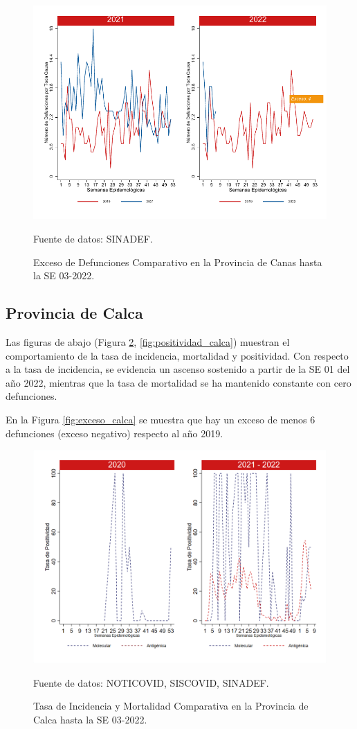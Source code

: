 \documentclass[12pt,a4paper,openany]{book}
\begin{document}
		\begin{figure}[h]
			\caption{Exceso de Defunciones Comparativo en la Provincia de Canas hasta la SE 03-2022.}\label{fig:exceso_canas}
			\begin{center}
				\includegraphics[width=0.7\linewidth]{../figuras/exceso_3.pdf}
			\end{center}
			{\footnotesize {Fuente de datos: SINADEF.}}
		\end{figure}
		
		\clearpage
		
		\subsection*{Provincia de Calca}
		\noindent Las figuras de abajo (Figura \ref{fig:inc_mort_calca}, \ref{fig:positividad_calca}) muestran el comportamiento de la tasa de incidencia, mortalidad y  positividad. Con respecto a la tasa de incidencia, se evidencia un ascenso sostenido a partir de la SE 01 del año 2022, mientras que la tasa de mortalidad se ha mantenido constante con cero defunciones. 
		
		En la Figura \ref{fig:exceso_calca} se muestra que hay un exceso de menos 6 defunciones (exceso negativo) respecto al año 2019.
		
		\begin{figure}[h]
			\caption{Tasa de Incidencia y Mortalidad Comparativa en la Provincia de Calca hasta la SE 03-2022.}\label{fig:inc_mort_calca}
			\begin{center}
				\includegraphics[width=0.7\linewidth]{../figuras/incidencia_mortalidad_20_21_4.png}
			\end{center}
			{\footnotesize {Fuente de datos: NOTICOVID, SISCOVID, SINADEF.}}
		\end{figure}
		
\end{document}
